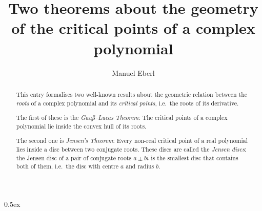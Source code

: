 \documentclass[11pt,a4paper]{article}
\begin{document}
\title{Two theorems about the geometry of the critical points of a complex polynomial}
\author{Manuel Eberl}
\maketitle

\begin{abstract}
This entry formalises two well-known results about the geometric relation between the \emph{roots}
of a complex polynomial and its \emph{critical points}, i.e.\ the roots of its derivative.

The first of these is the \emph{Gauß--Lucas Theorem}: The critical points of a 
complex polynomial lie inside the convex hull of its roots.

The second one is \emph{Jensen's Theorem}: Every non-real critical point of a
real polynomial lies inside a disc between two conjugate roots.
These discs are called the \emph{Jensen discs}: the Jensen disc of a pair of conjugate roots
$a \pm b i$ is the smallest disc that contains both of them, i.e.\ the disc with centre $a$ and 
radius $b$.
\end{abstract}


\newpage
\tableofcontents

\newpage
\parindent 0pt\parskip 0.5ex



\nocite{enescu2010}
\nocite{marden1966}
\raggedright


\end{document}
